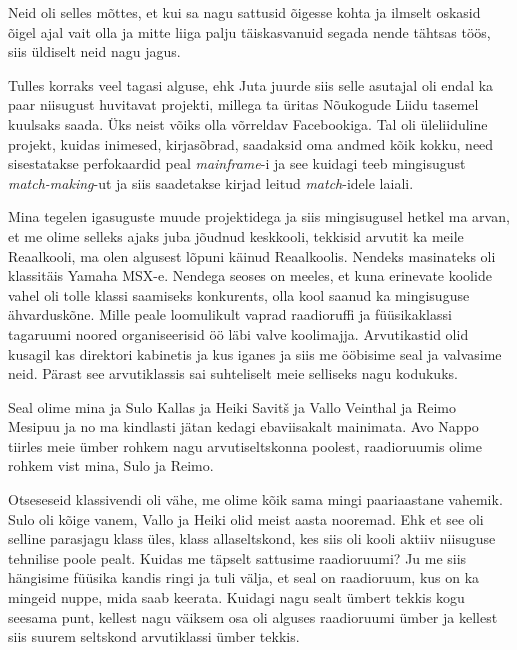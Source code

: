 
Neid oli selles mõttes, et kui sa nagu sattusid õigesse kohta ja ilmselt oskasid õigel ajal  vait olla ja mitte liiga palju täiskasvanuid  segada nende tähtsas töös,  siis üldiselt neid nagu jagus. 

Tulles korraks veel tagasi  alguse, ehk Juta juurde siis selle asutajal oli endal ka paar niisugust  huvitavat projekti, millega ta üritas Nõukogude Liidu tasemel kuulsaks saada. Üks neist võiks olla  võrreldav Facebookiga. Tal oli üleliiduline projekt, kuidas inimesed, kirjasõbrad, saadaksid oma andmed kõik kokku, need sisestatakse perfokaardid peal \emph{mainframe}-i ja see kuidagi teeb mingisugust \emph{match-making}-ut ja siis saadetakse kirjad leitud \emph{match}-idele laiali. 

Mina tegelen igasuguste muude projektidega ja siis mingisugusel hetkel ma arvan, et me olime selleks ajaks juba jõudnud keskkooli, tekkisid arvutit ka meile Reaalkooli, ma olen  algusest lõpuni käinud Reaalkoolis.  Nendeks masinateks oli klassitäis Yamaha MSX-e. Nendega seoses on meeles, et kuna erinevate koolide vahel oli tolle klassi saamiseks konkurents,  olla kool saanud ka mingisuguse ähvarduskõne. Mille peale loomulikult vaprad raadioruffi ja füüsikaklassi tagaruumi noored organiseerisid öö läbi valve koolimajja. Arvutikastid olid kusagil kas direktori kabinetis ja kus iganes ja siis me ööbisime seal ja valvasime neid. Pärast see arvutiklassis sai suhteliselt meie selliseks nagu kodukuks.


Seal olime mina ja Sulo Kallas ja Heiki Savitš ja Vallo Veinthal  ja Reimo Mesipuu ja no ma kindlasti jätan kedagi ebaviisakalt mainimata.  Avo Nappo tiirles meie ümber rohkem nagu arvutiseltskonna poolest, raadioruumis olime rohkem vist mina, Sulo ja Reimo.


Otseseseid klassivendi oli  vähe, me olime kõik sama mingi paariaastane vahemik. Sulo oli kõige vanem, Vallo ja Heiki  olid meist aasta nooremad. Ehk et see oli selline parasjagu  klass üles, klass allaseltskond, kes siis oli  kooli aktiiv niisuguse tehnilise poole pealt. Kuidas me täpselt sattusime raadioruumi? Ju me siis hängisime füüsika kandis ringi ja  tuli välja, et seal on raadioruum, kus on ka mingeid nuppe, mida saab keerata. Kuidagi nagu sealt ümbert tekkis kogu seesama punt, kellest nagu väiksem osa oli  alguses raadioruumi ümber ja kellest siis suurem seltskond arvutiklassi ümber tekkis. 

